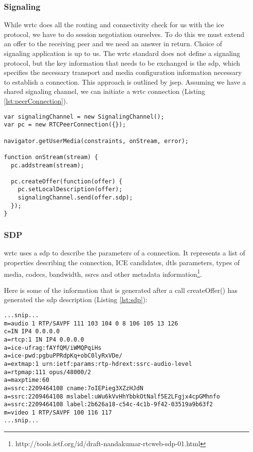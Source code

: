 \subsubsection{Signaling}
While \gls{wrtc} does all the routing and connectivity check for us with the \gls{ice} protocol, we have to do session negotiation ourselves. To do this we must extend an offer to the receiving peer and we need an answer in return. Choice of signaling application is up to us. The \gls{wrtc} standard does not define a signaling protocol, but the key information that needs to be exchanged is the \gls{sdp}, which specifies the necessary transport and media configuration information necessary to establish a connection. This approach is outlined by \gls{jsep}. Assuming we have a shared signaling channel, we can initiate a \gls{wrtc} connection (Listing \ref{lst:peerConnection}).


\begin{lstlisting}[caption={Initiating a RTCPeerConnection in WebRTC}, label={lst:peerConnection}]
var signalingChannel = new SignalingChannel();
var pc = new RTCPeerConnection({});

navigator.getUserMedia(constraints, onStream, error);

function onStream(stream) {
  pc.addstream(stream);

  pc.createOffer(function(offer) {
    pc.setLocalDescription(offer);
    signalingChannel.send(offer.sdp);
  });
}
\end{lstlisting}


\subsubsection{SDP}
\gls{wrtc} uses a \gls{sdp} to describe the parameters of a connection. It represents a list of properties describing the connection, ICE candidates, \gls{dtls} parameters, types of media, codecs, bandwidth, \gls{ssrc}s and other metadata information\footnote{http://tools.ietf.org/id/draft-nandakumar-rtcweb-sdp-01.html}.



Here is some of the information that is generated after a call createOffer() has generated the \gls{sdp} description (Listing \ref{lst:sdp}):

\begin{lstlisting}[frame=single, caption={Snippet of SDP description}, label={lst:sdp}]
...snip...
m=audio 1 RTP/SAVPF 111 103 104 0 8 106 105 13 126
c=IN IP4 0.0.0.0
a=rtcp:1 IN IP4 0.0.0.0
a=ice-ufrag:fAYfQM/iWMQPqiHs
a=ice-pwd:pgbuPPRdpKq+obC0lyRxVDe/
a=extmap:1 urn:ietf:params:rtp-hdrext:ssrc-audio-level
a=rtpmap:111 opus/48000/2
a=maxptime:60
a=ssrc:2209464108 cname:7oIEPieg3XZzHJdN
a=ssrc:2209464108 mslabel:uWu6kVvHhYbbkOtNalf5E2LFgjx4cpGMhnfo
a=ssrc:2209464108 label:2b626a18-c54c-4c1b-9f42-03519a9b63f2
m=video 1 RTP/SAVPF 100 116 117
...snip...
\end{lstlisting}


